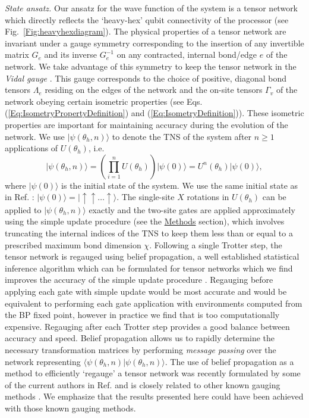 \documentclass[%
 superscriptaddress,
 amsmath,amssymb,
 prx, nofootinbib,
]{revtex4-2}
\begin{document}
\emph{State ansatz.} Our ansatz for the wave function of the system is a tensor network which directly reflects the `heavy-hex' qubit connectivity of the processor (see Fig.~\ref{Fig:heavyhexdiagram}). The physical properties of a tensor network are invariant under a gauge symmetry corresponding to the insertion of any invertible matrix $G_{e}$ and its inverse $G_{e}^{-1}$ on any contracted, internal bond/edge $e$ of the network.
We take advantage of this symmetry to keep the tensor network in the \emph{Vidal gauge} \cite{Vidal2003, Jiang2008}. This gauge corresponds to the choice of positive, diagonal bond tensors $\Lambda_{e}$ residing on the edges of the network and the on-site tensors $\Gamma_{v}$ of the network obeying certain isometric properties (see Eqs. (\ref{Eq:IsometryPropertyDefinition}) and (\ref{Eq:IsometryDefinition})). These isometric properties are important for maintaining accuracy during the evolution of the network. We use $\vert \psi(\theta_{h}, n) \rangle$ to denote the TNS of the system after $n \geq 1$ applications of $U(\theta_{h})$, i.e. 
\begin{equation}
    \vert \psi(\theta_{h}, n) \rangle = \left(\prod_{i=1}^{n}U(\theta_{h})\right)\vert \psi(0) \rangle = U^{n}(\theta_{h})\vert \psi(0) \rangle,
    \label{Eq:State}
\end{equation}
where $\vert \psi(0) \rangle$ is the initial state of the system. We use the same initial state as in Ref. \cite{kim2023}: $\vert \psi(0) \rangle = \vert\! \uparrow \uparrow \hdots \uparrow \rangle$.
The single-site $X$ rotations in $U(\theta_{h})$ can be applied to $\vert \psi(\theta_{h}, n) \rangle$ exactly and the two-site gates are applied approximately using the simple update \cite{Jiang2008} procedure (see the \hyperref[Sec:Methods]{Methods} section), which involves truncating the internal indices of the TNS to keep them less than or equal to a prescribed maximum bond dimension $\chi$. 
Following a single Trotter step, the tensor network is regauged using belief propagation, a well established statistical inference algorithm which can  be formulated for tensor networks \cite{TensorNetworkBeliefPropagation2} which we find improves the accuracy of the simple update procedure \cite{Jahromi2019, TindallGauging2023}. Regauging before applying each gate with simple update would be most accurate and would be equivalent to performing each gate application with environments computed from the BP fixed point, however in practice we find that is too computationally expensive. Regauging after each Trotter step provides a good balance between accuracy and speed. Belief propagation allows us to rapidly determine the necessary transformation matrices by performing \emph{message passing} over the network representing $\langle \psi(\theta_{h}, n) \vert \psi(\theta_{h}, n) \rangle$. The use of belief propagation as a method to efficiently `regauge' a tensor network was recently formulated by some of the current authors in Ref. \cite{TindallGauging2023} and is closely related to other known gauging methods  \cite{Ran2012, Phien2015, Jahromi2019, SimpleUpdateGauging3}. We emphasize that the results presented here could have been achieved with those known gauging methods.
\end{document}
